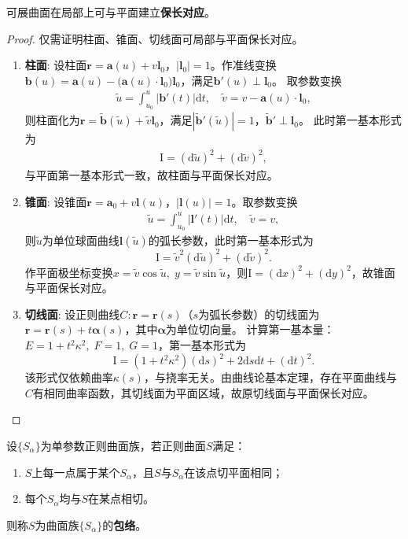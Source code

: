 \documentclass[../../main.tex]{subfiles}%
\begin{document}
\begin{theorem}
可展曲面在局部上可与平面建立\textbf{保长对应}。
\end{theorem}
\begin{proof}

仅需证明柱面、锥面、切线面可局部与平面保长对应。
\begin{enumerate}[(1)]
\item \textbf{柱面}:
设柱面$\bm r=\bm a(u)+v\bm l_0$，$|\bm l_0|=1$。作准线变换$\bm b(u)=\bm a(u)-\big(\bm a(u)\cdot\bm l_0\big)\bm l_0$，满足$\bm b'(u)\perp\bm l_0$。
取参数变换
\begin{align*}
\tilde u=\int_{u_0}^{u}|\bm b'(t)|\mathrm{d}t,\quad \tilde v=v-\bm a(u)\cdot\bm l_0,
\end{align*}
则柱面化为$\bm r=\tilde{\bm b}(\tilde u)+\tilde v\bm l_0$，满足$|\tilde{\bm b}'(\tilde u)|=1$，$\tilde{\bm b}'\perp\bm l_0$。
此时第一基本形式为
\begin{align*}
\mathrm{I}=(\mathrm{d}\tilde u)^2+(\mathrm{d}\tilde v)^2,
\end{align*}
与平面第一基本形式一致，故柱面与平面保长对应。

\item \textbf{锥面}:
设锥面$\bm r=\bm a_0+v\bm l(u)$，$|\bm l(u)|=1$。取参数变换
\begin{align*}
\tilde u=\int_{u_0}^{u}|\bm l'(t)|\mathrm{d}t,\quad \tilde v=v,
\end{align*}
则$\tilde u$为单位球面曲线$\bm l(\tilde u)$的弧长参数，此时第一基本形式为
$$\mathrm{I}=\tilde v^2(\mathrm{d}\tilde u)^2+(\mathrm{d}\tilde v)^2.$$
作平面极坐标变换$x=\tilde v\cos\tilde u,\;y=\tilde v\sin\tilde u$，则$\mathrm{I}=(\mathrm{d}x)^2+(\mathrm{d}y)^2$，故锥面与平面保长对应。

\item \textbf{切线面}:
设正则曲线$C:\bm r=\bm r(s)$（$s$为弧长参数）的切线面为$\bm r=\bm r(s)+t\bm\alpha(s)$，其中$\bm\alpha$为单位切向量。
计算第一基本量：$E=1+t^2\kappa^2,\;F=1,\;G=1$，第一基本形式为
$$\mathrm{I}=(1+t^2\kappa^2)(\mathrm{d}s)^2+2\mathrm{d}s\mathrm{d}t+(\mathrm{d}t)^2.$$
该形式仅依赖曲率$\kappa(s)$，与挠率无关。由曲线论基本定理，存在平面曲线与$C$有相同曲率函数，其切线面为平面区域，故原切线面与平面保长对应。
\end{enumerate}

\end{proof}

\begin{definition}
设$\{S_\alpha\}$为单参数正则曲面族，若正则曲面$S$满足：
\begin{enumerate}[(1)]
\item $S$上每一点属于某个$S_\alpha$，且$S$与$S_\alpha$在该点切平面相同；
\item 每个$S_\alpha$均与$S$在某点相切。
\end{enumerate}
则称$S$为曲面族$\{S_\alpha\}$的\textbf{包络}。
\end{definition}
\end{document}
